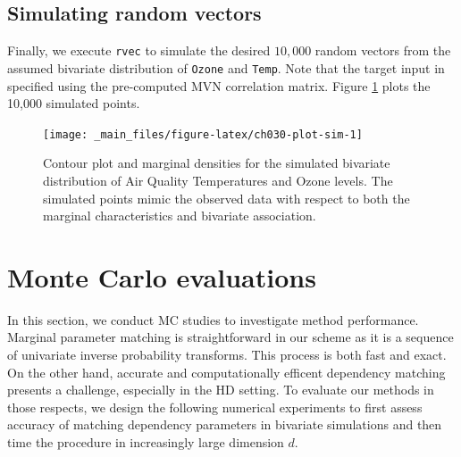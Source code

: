 \documentclass[
]{jss}
\begin{document}
\hypertarget{simulating-random-vectors}{%
\subsection{Simulating random vectors}\label{simulating-random-vectors}}

Finally, we execute \texttt{rvec} to simulate the desired \(10,000\) random vectors from the assumed bivariate distribution of \texttt{Ozone} and \texttt{Temp}. Note that the target input in specified using the pre-computed MVN correlation matrix. Figure \ref{fig:ch030-plot-sim} plots the 10,000 simulated points.

\begin{CodeChunk}
\end{CodeChunk}

\begin{CodeChunk}
\begin{figure}

{\centering \texttt{[image: \_main\_files/figure-latex/ch030-plot-sim-1]} 

}

\caption[Contour plot and marginal densities for the simulated bivariate distribution of Air Quality Temperatures and Ozone levels]{Contour plot and marginal densities for the simulated bivariate distribution of Air Quality Temperatures and Ozone levels. The simulated points mimic the observed data with respect to both the marginal characteristics and bivariate association.}\label{fig:ch030-plot-sim}
\end{figure}
\end{CodeChunk}

\clearpage

\hypertarget{simulations}{%
\section{Monte Carlo evaluations}\label{simulations}}

In this section, we conduct MC studies to investigate method performance. Marginal parameter matching is straightforward in our scheme as it is a sequence of univariate inverse probability transforms. This process is both fast and exact. On the other hand, accurate and computationally efficent dependency matching presents a challenge, especially in the HD setting. To evaluate our methods in those respects, we design the following numerical experiments to first assess accuracy of matching dependency parameters in bivariate simulations and then time the procedure in increasingly large dimension \(d\).
\end{document}
